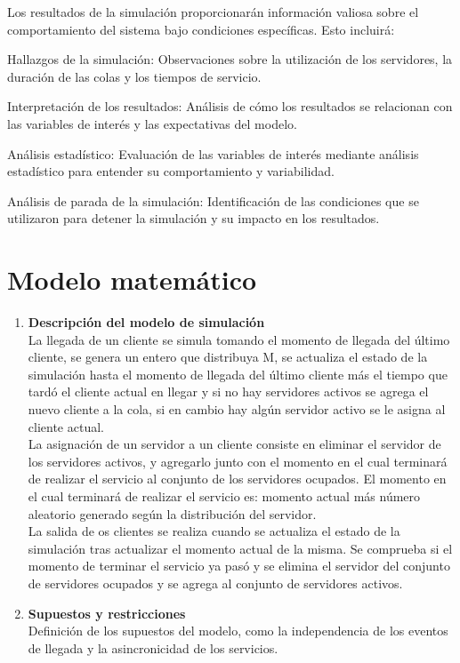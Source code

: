 \documentclass[article]{amsart}
\begin{document}
Los resultados de la simulación proporcionarán información valiosa sobre el comportamiento del sistema bajo condiciones específicas. Esto incluirá:

    Hallazgos de la simulación: Observaciones sobre la utilización de los servidores, la duración de las colas y los tiempos de servicio.

    Interpretación de los resultados: Análisis de cómo los resultados se relacionan con las variables de interés y las expectativas del modelo.

    Análisis estadístico: Evaluación de las variables de interés mediante análisis estadístico para entender su comportamiento y variabilidad.

    Análisis de parada de la simulación: Identificación de las condiciones que se utilizaron para detener la simulación y su impacto en los resultados.

\newpage
\section{Modelo matem\'atico}

\begin{enumerate}
\item \textbf{Descripción del modelo de simulación}\\
    La llegada de un cliente se simula tomando el momento de llegada del \'ultimo cliente, se genera un entero que distribuya M, se actualiza el estado de la simulaci\'on hasta el momento de llegada del \'ultimo cliente m\'as el tiempo que tard\'o el cliente actual en llegar y si no hay servidores activos se agrega el nuevo cliente a la cola, si en cambio hay alg\'un servidor activo se le asigna al cliente actual.\\
    La asignaci\'on de un servidor a un cliente consiste en eliminar el servidor de los servidores activos, y agregarlo junto con el momento en el cual terminar\'a de realizar el servicio al conjunto de los servidores ocupados. El momento en el cual terminar\'a de realizar el servicio es: momento actual m\'as n\'umero aleatorio generado seg\'un la distribuci\'on del servidor.\\
    La salida de os clientes se realiza cuando se actualiza el estado de la simulaci\'on tras actualizar el momento actual de la misma. Se comprueba si el momento de terminar el servicio ya pas\'o y se elimina el servidor del conjunto de servidores ocupados y se agrega al conjunto de servidores activos.\\

\item \textbf{Supuestos y restricciones}\\
Definición de los supuestos del modelo, como la independencia de los eventos de llegada y la asincronicidad de los servicios.


\end{enumerate}
\end{document}
